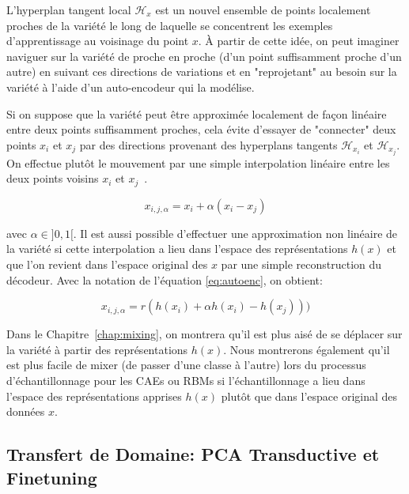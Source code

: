 L'hyperplan tangent local $\mathcal{H}_{x}$ est un nouvel ensemble de points
localement proches de la variété le long de laquelle se concentrent les
exemples d'apprentissage au voisinage du point $x$.  À partir de cette idée, on
peut imaginer naviguer sur la variété de proche en proche (d'un point
suffisamment proche d'un autre) en suivant ces directions de variations et en
"reprojetant" au besoin sur la variété à l'aide d'un auto-encodeur qui la
modélise.

Si on suppose que la variété peut être approximée localement de façon linéaire
entre deux points suffisamment proches, cela évite d'essayer de "connecter"
deux points $x_i$ et $x_j$ par des directions provenant des hyperplans tangents
$\mathcal{H}_{x_i}$ et $\mathcal{H}_{x_j}$. On effectue plutôt le mouvement par une
simple interpolation linéaire entre les deux points voisins $x_{i}$ et $x_{j}$~\citep{Mesnil-et-al-LW2012}.

\begin{equation}
x_{i,j,\alpha} = x_{i} + \alpha (x_{i} - x_{j})
\end{equation}

avec $\alpha \in ]0,1[$. Il est aussi possible d'effectuer une approximation
non linéaire de la variété si cette interpolation a lieu dans l'espace des
représentations $h(x)$ et que l'on revient dans l'espace original des $x$ par une
simple reconstruction du décodeur. Avec la notation de l'équation
\ref{eq:autoenc}, on obtient:

\begin{equation}
x_{i,j,\alpha} = r(h(x_{i}) + \alpha h(x_{i}) - h(x_{j})))
\end{equation}

Dans le Chapitre~\ref{chap:mixing}, on montrera qu'il est plus aisé de se déplacer sur la
variété à partir des représentations $h(x)$. Nous montrerons également 
qu'il est plus facile de mixer (de passer d'une classe à l'autre)
lors du processus d'échantillonnage pour les CAEs ou RBMs si l'échantillonnage a lieu dans
l'espace des représentations apprises $h(x)$ plutôt que dans l'espace
original des données $x$.

\subsection{Transfert de Domaine: PCA Transductive et Finetuning}

